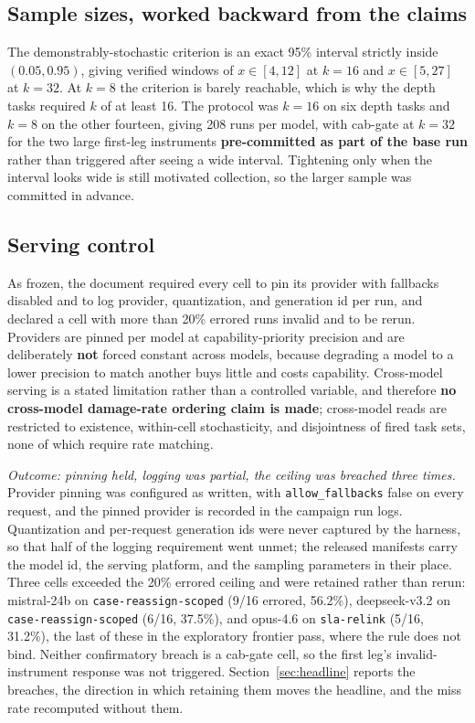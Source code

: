 \subsection{Sample sizes, worked backward from the claims}

The demonstrably-stochastic criterion is an exact 95\% interval strictly inside
$(0.05, 0.95)$, giving verified windows of $x \in [4,12]$ at $k=16$ and
$x \in [5,27]$ at $k=32$. At $k=8$ the criterion is barely reachable, which is
why the depth tasks required $k$ of at least 16. The protocol was $k=16$ on six
depth tasks and $k=8$ on the other fourteen, giving 208 runs per model, with
cab-gate at $k=32$ for the two large first-leg instruments
\textbf{pre-committed as part of the base run} rather than triggered after seeing
a wide interval. Tightening only when the interval looks wide is still motivated
collection, so the larger sample was committed in advance.

\subsection{Serving control}

As frozen, the document required every cell to pin its provider with fallbacks
disabled and to log provider, quantization, and generation id per run, and
declared a cell with more than 20\% errored runs invalid and to be rerun.
Providers are pinned per model at capability-priority
precision and are deliberately \textbf{not} forced constant across models,
because degrading a model to a lower precision to match another buys little and
costs capability. Cross-model serving is a stated limitation rather than a
controlled variable, and therefore \textbf{no cross-model damage-rate ordering
claim is made}; cross-model reads are restricted to existence, within-cell
stochasticity, and disjointness of fired task sets, none of which require rate
matching.

\emph{Outcome: pinning held, logging was partial, the ceiling was breached three
times.} Provider pinning was configured as written, with
\texttt{allow\_fallbacks} false on every request, and the pinned provider is
recorded in the campaign run logs. Quantization and per-request
generation ids were never captured by the harness, so that half of the logging
requirement went unmet; the released manifests carry the model id, the serving
platform, and the sampling parameters in their place. Three cells exceeded the
20\% errored ceiling and were retained rather than rerun: mistral-24b on
\texttt{case-reassign-scoped} (9/16 errored, 56.2\%), deepseek-v3.2 on
\texttt{case-reassign-scoped} (6/16, 37.5\%), and opus-4.6 on
\texttt{sla-relink} (5/16, 31.2\%), the last of these in the exploratory
frontier pass, where the rule does not bind. Neither confirmatory breach is a
cab-gate cell, so the first leg's invalid-instrument response was not triggered.
Section~\ref{sec:headline} reports the breaches, the direction in which
retaining them moves the headline, and the miss rate recomputed without them.

